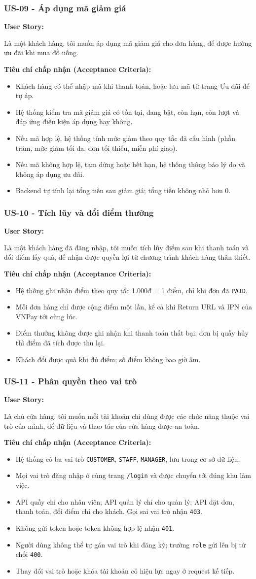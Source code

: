 \documentclass[12pt,a4paper]{article}
\newcommand{\userstory}[2]{%
  \noindent\textbf{User Story:}\par
  #1\par
  \hspace*{\parindent}\textbf{Tiêu chí chấp nhận (Acceptance Criteria):}
  \begin{itemize}
    #2
  \end{itemize}}
\begin{document}
\subsubsection{US-09 - Áp dụng mã giảm giá}
\userstory{Là một khách hàng, tôi muốn áp dụng mã giảm giá cho đơn hàng, để được hưởng ưu đãi khi mua đồ uống.}{
  \item Khách hàng có thể nhập mã khi thanh toán, hoặc lưu mã từ trang Ưu đãi để tự áp.
  \item Hệ thống kiểm tra mã giảm giá có tồn tại, đang bật, còn hạn, còn lượt và đáp ứng điều kiện áp dụng hay không.
  \item Nếu mã hợp lệ, hệ thống tính mức giảm theo quy tắc đã cấu hình (phần trăm, mức giảm tối đa, đơn tối thiểu, miễn phí giao).
  \item Nếu mã không hợp lệ, tạm dừng hoặc hết hạn, hệ thống thông báo lý do và không áp dụng ưu đãi.
  \item Backend tự tính lại tổng tiền sau giảm giá; tổng tiền không nhỏ hơn 0.
}

\subsubsection{US-10 - Tích lũy và đổi điểm thưởng}
\userstory{Là một khách hàng đã đăng nhập, tôi muốn tích lũy điểm sau khi thanh toán và đổi điểm lấy quà, để nhận được quyền lợi từ chương trình khách hàng thân thiết.}{
  \item Hệ thống ghi nhận điểm theo quy tắc 1.000đ = 1 điểm, chỉ khi đơn đã \texttt{PAID}.
  \item Mỗi đơn hàng chỉ được cộng điểm một lần, kể cả khi Return URL và IPN của VNPay tới cùng lúc.
  \item Điểm thưởng không được ghi nhận khi thanh toán thất bại; đơn bị quầy hủy thì điểm đã tích được thu lại.
  \item Khách đổi được quà khi đủ điểm; số điểm không bao giờ âm.
}

\subsubsection{US-11 - Phân quyền theo vai trò}
\userstory{Là chủ cửa hàng, tôi muốn mỗi tài khoản chỉ dùng được các chức năng thuộc vai trò của mình, để dữ liệu và thao tác của cửa hàng được an toàn.}{
  \item Hệ thống có ba vai trò \texttt{CUSTOMER}, \texttt{STAFF}, \texttt{MANAGER}, lưu trong cơ sở dữ liệu.
  \item Mọi vai trò đăng nhập ở cùng trang \texttt{/login} và được chuyển tới đúng khu làm việc.
  \item API quầy chỉ cho nhân viên; API quản lý chỉ cho quản lý; API đặt đơn, thanh toán, đổi điểm chỉ cho khách. Gọi sai vai trò nhận \texttt{403}.
  \item Không gửi token hoặc token không hợp lệ nhận \texttt{401}.
  \item Người dùng không thể tự gán vai trò khi đăng ký; trường \texttt{role} gửi lên bị từ chối \texttt{400}.
  \item Thay đổi vai trò hoặc khóa tài khoản có hiệu lực ngay ở request kế tiếp.
}
\end{document}
